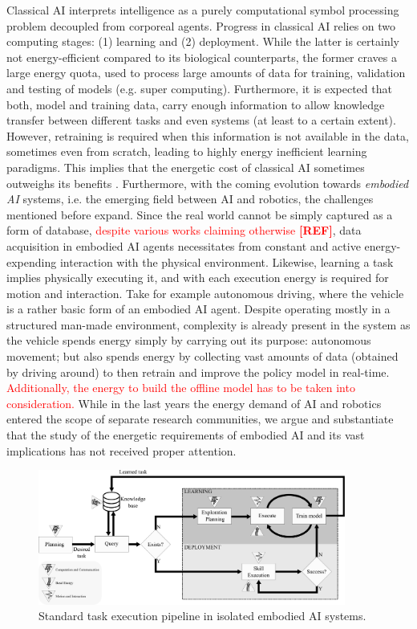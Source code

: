 Classical AI interprets intelligence as a purely computational symbol processing problem decoupled from corporeal agents. Progress in classical AI relies on two computing stages: (1) learning and (2) deployment. While the latter is certainly not energy-efficient compared to its biological counterparts, the former craves a large energy quota, used to process large amounts of data for training, validation and testing of models (e.g. super computing). Furthermore, it is expected that both, model and training data, carry enough information to allow knowledge transfer between different tasks and even systems (at least to a certain extent). However, retraining is required when this information is not available in the data, sometimes even from scratch, leading to highly energy inefficient learning paradigms. This implies that the energetic cost of classical AI sometimes outweighs its benefits \cite{Strubell2019EnergyAP}. Furthermore, with the coming evolution towards \emph{embodied AI} systems, i.e. the emerging field between AI and robotics, the challenges mentioned before expand. Since the real world cannot be simply captured as a form of database, \textcolor{red}{despite various works claiming otherwise \textbf{[REF]}}, data acquisition in embodied AI agents necessitates from constant and active energy-expending interaction with the physical environment. Likewise, learning a task implies physically executing it, and with each execution energy is required for motion and interaction. Take for example autonomous driving, where the vehicle is a rather basic form of an embodied AI agent. Despite operating mostly in a structured man-made environment, complexity is already present in the system as the vehicle spends energy simply by carrying out its purpose: autonomous movement; but also spends energy by collecting vast amounts of data (obtained by driving around) to then retrain and improve the policy model in real-time. \textcolor{red}{Additionally, the energy to build the offline model has to be taken into consideration.} While in the last years the energy demand of AI and robotics entered the scope of separate research communities, we argue and substantiate that the study of the energetic requirements of embodied AI and its vast implications has not received proper attention. 
\begin{figure}[!t]
	\centering
	\includegraphics[width=0.9\textwidth]{fig/embodied_ai_learning_pipeline_v7.pdf}
	\caption{Standard task execution pipeline in isolated embodied AI systems.}
	\label{fig:embodied_ai_pipeline}
\end{figure}
